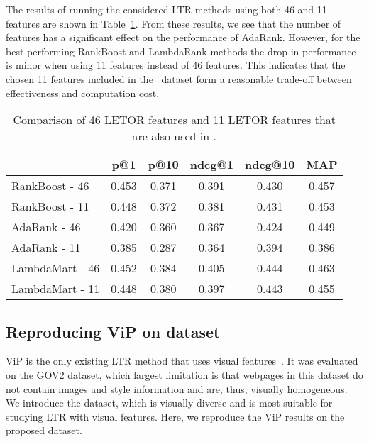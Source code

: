 The results of running the considered \ac{LTR} methods using both 46 and 11 features are shown in Table~\ref{tab:11vs46}.
From these results, we see that the number of features has a significant effect on the performance of AdaRank.
However, for the best-performing RankBoost and LambdaRank methods the drop in performance is minor when using 11 features instead of 46 features.
This indicates that the chosen 11 features included in the \datasetname~dataset form a reasonable trade-off between effectiveness and computation cost.

\begin{table}[t]
\caption{Comparison of 46 LETOR features and 11 LETOR features that are also used in \datasetname.}
\label{tab:11vs46}
\centering
\begin{tabular}{l@{~~}ccccc}
\toprule
           & p@1  & p@10   & ndcg@1 & ndcg@10 & MAP \\ 
\midrule
RankBoost - 46 & 0.453 & 0.371 & 0.391 & 0.430  & 0.457 \\
RankBoost - 11 & 0.448 & 0.372 & 0.381  & 0.431   & 0.453 \\
\midrule
AdaRank - 46  & 0.420 & 0.360 & 0.367 & 0.424  & 0.449 \\
AdaRank - 11  & 0.385 & 0.287 & 0.364  & 0.394   & 0.386 \\ 
\midrule
LambdaMart - 46 & 0.452 & 0.384 & 0.405 & 0.444  & 0.463 \\
LambdaMart - 11 & 0.448 & 0.380 & 0.397  & 0.443   & 0.455 \\
\bottomrule
\end{tabular}
\end{table}



\subsection{Reproducing ViP on \datasetname{} dataset}
ViP is the only existing \ac{LTR} method that uses visual features~\cite{fan2017learning}.
It was evaluated on the GOV2 dataset, which largest limitation is that webpages in this dataset do not contain images and style information and are, thus, visually homogeneous.
We introduce the \datasetname{} dataset, which is visually diverse and is most suitable for studying \ac{LTR} with visual features.
Here, we reproduce the ViP results on the proposed \datasetname{} dataset.

